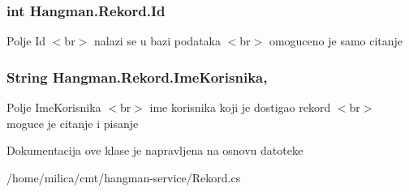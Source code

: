 \subsubsection[{Id}]{\setlength{\rightskip}{0pt plus 5cm}int Hangman.\+Rekord.\+Id\hspace{0.3cm}{\ttfamily [get]}}\label{classHangman_1_1Rekord_a80a64fd7b7b6c5f239d5a218c1eb3312}
Polje Id $<$br$>$ nalazi se u bazi podataka $<$br$>$ omoguceno je samo citanje \hypertarget{classHangman_1_1Rekord_a2f7bebc6fd9da6c2b32a783edcfb1e5b}{}
\subsubsection[{Ime\+Korisnika}]{\setlength{\rightskip}{0pt plus 5cm}String Hangman.\+Rekord.\+Ime\+Korisnika\hspace{0.3cm}{\ttfamily [get]}, {\ttfamily [set]}}\label{classHangman_1_1Rekord_a2f7bebc6fd9da6c2b32a783edcfb1e5b}
Polje Ime\+Korisnika $<$br$>$ ime korisnika koji je dostigao rekord $<$br$>$ moguce je citanje i pisanje 

Dokumentacija ove klase je napravljena na osnovu datoteke \begin{DoxyCompactItemize}
\item 
/home/milica/cmt/hangman-\/service/Rekord.\+cs\end{DoxyCompactItemize}
